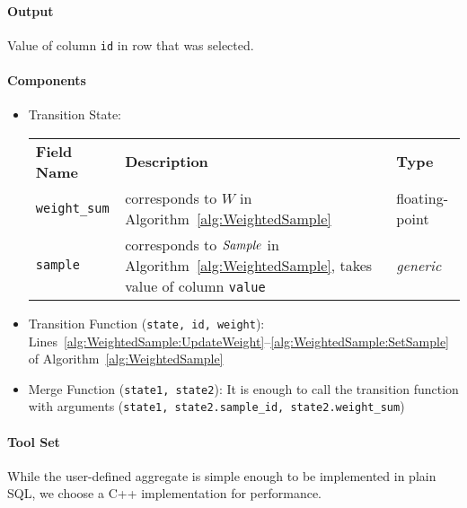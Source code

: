 \paragraph{Output}

Value of column \texttt{id} in row that was selected.

\paragraph{Components}

\begin{itemize}
	\item Transition State:
		\begin{center}
			\begin{tabularx}{\linewidth}{lXl}
				\toprule%
				\textbf{Field Name} & \textbf{Description} & \textbf{Type}
				\\\otoprule
				\texttt{weight\_sum} &
				corresponds to $W$ in Algorithm~\ref{alg:WeightedSample} &
				floating-point
				\\\midrule
				\texttt{sample} &
				corresponds to $\mathit{Sample}$ in Algorithm~\ref{alg:WeightedSample}, takes value of column \texttt{value} &
				\textit{generic}
				\\\bottomrule
			\end{tabularx}
		\end{center}
	\item Transition Function (\texttt{state, id, weight}): Lines~\ref{alg:WeightedSample:UpdateWeight}--\ref{alg:WeightedSample:SetSample} of Algorithm~\ref{alg:WeightedSample}
	\item Merge Function (\texttt{state1, state2}): It is enough to call the transition function with arguments (\texttt{state1, state2.sample\_id, state2.weight\_sum})
\end{itemize}

\paragraph{Tool Set}

While the user-defined aggregate is simple enough to be implemented in plain SQL, we choose a C++ implementation for performance. 
